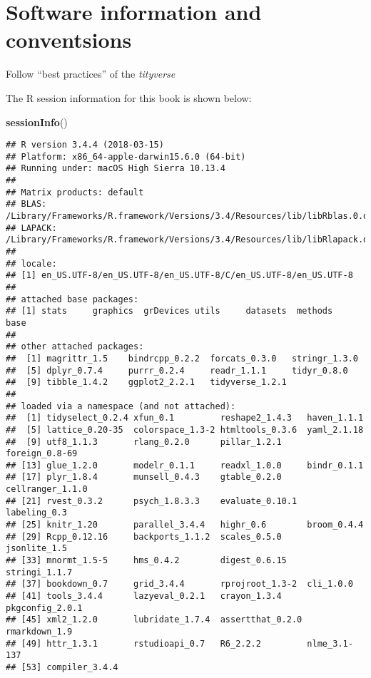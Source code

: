 \documentclass[]{book}
\newenvironment{Shaded}{\begin{snugshade}}{\end{snugshade}}
\newcommand{\KeywordTok}[1]{\textcolor[rgb]{0.13,0.29,0.53}{\textbf{#1}}}
\newcommand{\NormalTok}[1]{#1}
\theoremstyle{definition}
\theoremstyle{definition}
\theoremstyle{definition}
\theoremstyle{remark}
\begin{document}
\hypertarget{software-information-and-conventsions}{%
\section*{Software information and
conventsions}\label{software-information-and-conventsions}}

Follow ``best practices'' of the \emph{tityverse}

The R session information for this book is shown below:

\begin{Shaded}
\begin{Highlighting}[]
\KeywordTok{sessionInfo}\NormalTok{()}
\end{Highlighting}
\end{Shaded}

\begin{verbatim}
## R version 3.4.4 (2018-03-15)
## Platform: x86_64-apple-darwin15.6.0 (64-bit)
## Running under: macOS High Sierra 10.13.4
## 
## Matrix products: default
## BLAS: /Library/Frameworks/R.framework/Versions/3.4/Resources/lib/libRblas.0.dylib
## LAPACK: /Library/Frameworks/R.framework/Versions/3.4/Resources/lib/libRlapack.dylib
## 
## locale:
## [1] en_US.UTF-8/en_US.UTF-8/en_US.UTF-8/C/en_US.UTF-8/en_US.UTF-8
## 
## attached base packages:
## [1] stats     graphics  grDevices utils     datasets  methods   base     
## 
## other attached packages:
##  [1] magrittr_1.5    bindrcpp_0.2.2  forcats_0.3.0   stringr_1.3.0  
##  [5] dplyr_0.7.4     purrr_0.2.4     readr_1.1.1     tidyr_0.8.0    
##  [9] tibble_1.4.2    ggplot2_2.2.1   tidyverse_1.2.1
## 
## loaded via a namespace (and not attached):
##  [1] tidyselect_0.2.4 xfun_0.1         reshape2_1.4.3   haven_1.1.1     
##  [5] lattice_0.20-35  colorspace_1.3-2 htmltools_0.3.6  yaml_2.1.18     
##  [9] utf8_1.1.3       rlang_0.2.0      pillar_1.2.1     foreign_0.8-69  
## [13] glue_1.2.0       modelr_0.1.1     readxl_1.0.0     bindr_0.1.1     
## [17] plyr_1.8.4       munsell_0.4.3    gtable_0.2.0     cellranger_1.1.0
## [21] rvest_0.3.2      psych_1.8.3.3    evaluate_0.10.1  labeling_0.3    
## [25] knitr_1.20       parallel_3.4.4   highr_0.6        broom_0.4.4     
## [29] Rcpp_0.12.16     backports_1.1.2  scales_0.5.0     jsonlite_1.5    
## [33] mnormt_1.5-5     hms_0.4.2        digest_0.6.15    stringi_1.1.7   
## [37] bookdown_0.7     grid_3.4.4       rprojroot_1.3-2  cli_1.0.0       
## [41] tools_3.4.4      lazyeval_0.2.1   crayon_1.3.4     pkgconfig_2.0.1 
## [45] xml2_1.2.0       lubridate_1.7.4  assertthat_0.2.0 rmarkdown_1.9   
## [49] httr_1.3.1       rstudioapi_0.7   R6_2.2.2         nlme_3.1-137    
## [53] compiler_3.4.4
\end{verbatim}
\end{document}
